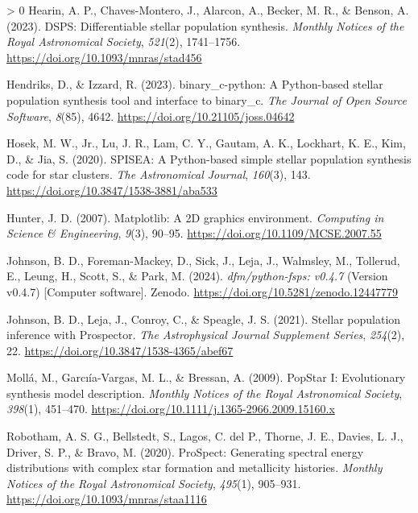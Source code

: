 \documentclass[10pt,a4paper,onecolumn]{article}
\newlength{\cslhangindent}
\newenvironment{CSLReferences}[3] %
 {%
  \setlength{\parindent}{0pt}
  \ifodd #1 \everypar{\setlength{\hangindent}{\cslhangindent}}\ignorespaces\fi
  \ifnum #2 > 0
  \setlength{\parskip}{#2\baselineskip}
  \fi
 }%
 {}
\begin{document}
\begin{CSLReferences}{1}{0}
\leavevmode\hypertarget{ref-hearin+23}{}%
Hearin, A. P., Chaves-Montero, J., Alarcon, A., Becker, M. R., \&
Benson, A. (2023). {DSPS: Differentiable stellar population synthesis}.
\emph{Monthly Notices of the Royal Astronomical Society}, \emph{521}(2),
1741--1756. \url{https://doi.org/10.1093/mnras/stad456}

\leavevmode\hypertarget{ref-hendriksux5cux26Izzard23}{}%
Hendriks, D., \& Izzard, R. (2023). {binary\_c-python: A Python-based
stellar population synthesis tool and interface to binary\_c}. \emph{The
Journal of Open Source Software}, \emph{8}(85), 4642.
\url{https://doi.org/10.21105/joss.04642}

\leavevmode\hypertarget{ref-hosek+20}{}%
Hosek, M. W., Jr., Lu, J. R., Lam, C. Y., Gautam, A. K., Lockhart, K.
E., Kim, D., \& Jia, S. (2020). {SPISEA}: A {Python}-based simple
stellar population synthesis code for star clusters. \emph{The
Astronomical Journal}, \emph{160}(3), 143.
\url{https://doi.org/10.3847/1538-3881/aba533}

\leavevmode\hypertarget{ref-hunter:2007}{}%
Hunter, J. D. (2007). Matplotlib: A {2D} graphics environment.
\emph{Computing in Science \& Engineering}, \emph{9}(3), 90--95.
\url{https://doi.org/10.1109/MCSE.2007.55}

\leavevmode\hypertarget{ref-jonhson+24}{}%
Johnson, B. D., Foreman-Mackey, D., Sick, J., Leja, J., Walmsley, M.,
Tollerud, E., Leung, H., Scott, S., \& Park, M. (2024).
\emph{{dfm/python-fsps: v0.4.7}} (Version v0.4.7) {[}Computer
software{]}. Zenodo. \url{https://doi.org/10.5281/zenodo.12447779}

\leavevmode\hypertarget{ref-johnson+21}{}%
Johnson, B. D., Leja, J., Conroy, C., \& Speagle, J. S. (2021). Stellar
population inference with {Prospector}. \emph{The Astrophysical Journal
Supplement Series}, \emph{254}(2), 22.
\url{https://doi.org/10.3847/1538-4365/abef67}

\leavevmode\hypertarget{ref-molla+09}{}%
Moll\'a, M., Garcı\'ia-Vargas, M. L., \& Bressan, A. (2009). {PopStar I}:
Evolutionary synthesis model description. \emph{Monthly Notices of the
Royal Astronomical Society}, \emph{398}(1), 451--470.
\url{https://doi.org/10.1111/j.1365-2966.2009.15160.x}

\leavevmode\hypertarget{ref-robotham+20}{}%
Robotham, A. S. G., Bellstedt, S., Lagos, C. del P., Thorne, J. E.,
Davies, L. J., Driver, S. P., \& Bravo, M. (2020). {ProSpect}:
Generating spectral energy distributions with complex star formation and
metallicity histories. \emph{Monthly Notices of the Royal Astronomical
Society}, \emph{495}(1), 905--931.
\url{https://doi.org/10.1093/mnras/staa1116}


\end{CSLReferences}
\end{document}
